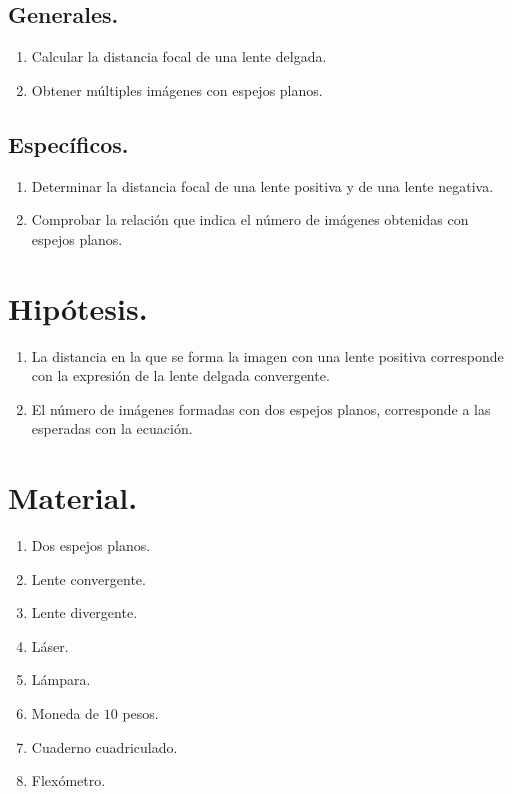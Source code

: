 \documentclass[14pt]{extarticle}
\begin{document}
\subsection{Generales.}

\begin{enumerate}
    \item Calcular la distancia focal de una lente delgada.
    \item Obtener múltiples imágenes con espejos planos.
\end{enumerate}

\subsection{Específicos.}

\begin{enumerate}
\item Determinar la distancia focal de una lente positiva y de una lente negativa.
\item Comprobar la relación que indica el número de imágenes obtenidas con espejos planos.
\end{enumerate}

\section{Hipótesis.}

\begin{enumerate}
\item La distancia en la que se forma la imagen con una lente positiva corresponde con la expresión de la lente delgada convergente.
\item El número de imágenes formadas con dos espejos planos, corresponde a las esperadas con la ecuación.
\end{enumerate}

\section{Material.}

\begin{multicols}{2}
\begin{enumerate}
\itemsep0.15em 
\item Dos espejos planos.
\item Lente convergente.
\item Lente divergente.
\item Láser.
\item Lámpara.
\item Moneda de $10$ pesos.
\item Cuaderno cuadriculado.
\item Flexómetro.
\end{enumerate}
\end{multicols}
\end{document}
